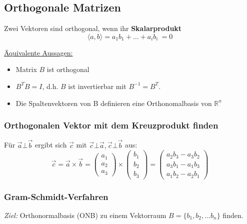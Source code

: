 \subsection{Orthogonale Matrizen}

Zwei Vektoren sind orthogonal, wenn ihr \textbf{Skalarprodukt}\\ 
\begin{equation*}
    \langle a, b \rangle = a_1 b_1 + \hdots + a_i b_i\ = 0
\end{equation*}

\underline{Äquivalente Aussagen:}
\begin{itemize}
    \item Matrix \(B\) ist orthogonal
    \item \(B^T B = I\), d.h. \(B\) ist invertierbar mit \(B^{-1}=B^T\).
    \item Die Spaltenvektoren von B definieren eine Orthonomalbasis von \(\mathbb{R}^n\)\\
\end{itemize}

\subsubsection{Orthogonalen Vektor mit dem Kreuzprodukt finden}
Für \(\vec{a} \bot \vec{b}\) ergibt sich \(\vec{c}\) mit \(\vec{c} \bot \vec{a}, \vec{c} \bot \vec{b}\) aus:
\begin{equation*}
    \vec{c} = 
    \vec{a} \times \vec{b} = \begin{pmatrix}
        a_1 \\
        a_2 \\
        a_3
    \end{pmatrix} \times
    \begin{pmatrix}
        b_1 \\
        b_2 \\
        b_3
    \end{pmatrix} =
    \begin{pmatrix}
        a_2 b_3 - a_3 b_2 \\
        a_3 b_1 - a_1 b_3 \\
        a_1 b_2 - a_2 b_1
    \end{pmatrix}
\end{equation*}

\subsubsection{Gram-Schmidt-Verfahren}
\textit{Ziel:} Orthonormalbasis (ONB) zu einem Vektorraum \(B=\{b_1, b_2, \hdots b_n\}\) finden.

